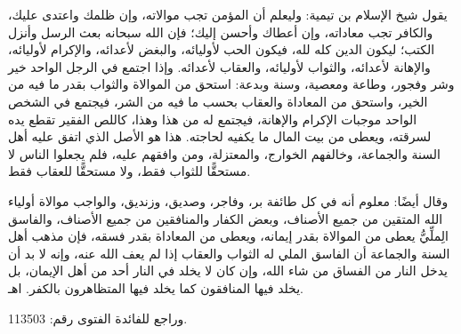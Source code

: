 يقول شيخ الإسلام بن تيمية: وليعلم أن المؤمن تجب موالاته، وإن ظلمك واعتدى عليك، والكافر تجب معاداته، وإن أعطاك وأحسن إليك؛ فإن الله سبحانه بعث الرسل وأنزل الكتب؛ ليكون الدين كله لله، فيكون الحب لأوليائه، والبغض لأعدائه، والإكرام لأوليائه، والإهانة لأعدائه، والثواب لأوليائه، والعقاب لأعدائه. وإذا اجتمع في الرجل الواحد خير وشر وفجور، وطاعة ومعصية، وسنة وبدعة: استحق من الموالاة والثواب بقدر ما فيه من الخير، واستحق من المعاداة والعقاب بحسب ما فيه من الشر، فيجتمع في الشخص الواحد موجبات الإكرام والإهانة، فيجتمع له من هذا وهذا، كاللص الفقير تقطع يده لسرقته، ويعطى من بيت المال ما يكفيه لحاجته. هذا هو الأصل الذي اتفق عليه أهل السنة والجماعة، وخالفهم الخوارج، والمعتزلة، ومن وافقهم عليه، فلم يجعلوا الناس لا مستحقًّا للثواب فقط، ولا مستحقًّا للعقاب فقط. 

وقال أيضًا: معلوم أنه في كل طائفة بر، وفاجر، وصديق، وزنديق، والواجب موالاة أولياء الله المتقين من جميع الأصناف، وبعض الكفار والمنافقين من جميع الأصناف، والفاسق الِملِّيُّ يعطى من الموالاة بقدر إيمانه، ويعطى من المعاداة بقدر فسقه، فإن مذهب أهل السنة والجماعة أن الفاسق الملي له الثواب والعقاب إذا لم يعف الله عنه، وإنه لا بد أن يدخل النار من الفساق من شاء الله، وإن كان لا يخلد في النار أحد من أهل الإيمان، بل يخلد فيها المنافقون كما يخلد فيها المتظاهرون بالكفر. اهـ.

وراجع للفائدة الفتوى رقم: 113503.
